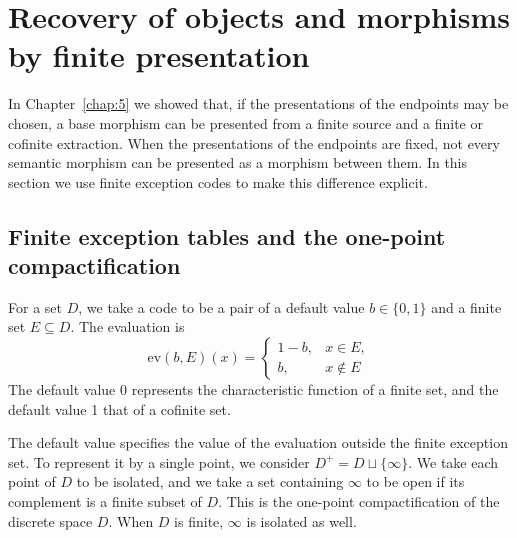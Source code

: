 \section{Recovery of objects and morphisms by finite presentation}\label{sec:8.1}

In Chapter~\ref{chap:5} we showed that, if the presentations of the endpoints may be chosen,
a base morphism can be presented from a finite source and a finite or cofinite extraction.
When the presentations of the endpoints are fixed, not every semantic morphism can be
presented as a morphism between them.
In this section we use finite exception codes to make this difference explicit.

\subsection*{Finite exception tables and the one-point compactification}

\begin{definition}\label{def:8.1}

For a set $D$, we take a code to be a pair of a default value $b\in\{0,1\}$ and a finite set
$E\subseteq D$. The evaluation is
\begin{equation*}
\mathrm{ev}(b,E)(x)=
\begin{cases}
1-b,&x\in E,\\
b,&x\notin E
\end{cases}
\tag{8.1}\label{eq:8.1}
\end{equation*}
The default value 0 represents the characteristic function of a finite set, and the default
value 1 that of a cofinite set.

The default value specifies the value of the evaluation outside the finite exception set.
To represent it by a single point, we consider $D^+=D\sqcup\{\infty\}$.
We take each point of $D$ to be isolated, and we take a set containing $\infty$ to be open
if its complement is a finite subset of $D$.
This is the one-point compactification of the discrete space $D$.
When $D$ is finite, $\infty$ is isolated as well.

\end{definition}

